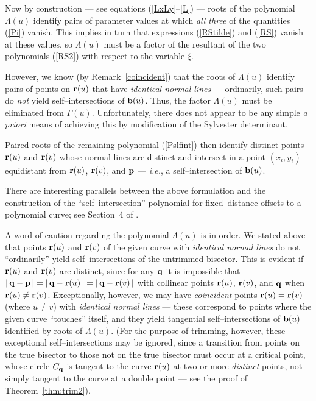 Now by construction --- see equations (\ref{LxLy}--\ref{L}) --- roots
of the polynomial $\Lambda(u)$ identify pairs of parameter values at
which {\it all three\/} of the quantities (\ref{Pi}) vanish. This
implies in turn that expressions (\ref{RStilde}) and (\ref{RS}) vanish
at these values, so $\Lambda(u)$ must be a factor of the resultant
of the two polynomials (\ref{RS2}) with respect to the variable $\xi$.

However, we know (by Remark~\ref{coincident}) that the roots of
$\Lambda(u)$ identify pairs of points on ${\bf r}(u)$ that have {\it
identical normal lines\/} --- ordinarily, such pairs do {\it not\/}
yield self--intersections of ${\bf b}(u)$. Thus, the factor $\Lambda(u)$
must be eliminated from $\Gamma(u)$. Unfortunately, there does not appear
to be any simple {\it a priori\/} means of achieving this by modification
of the Sylvester determinant.

Paired roots of the remaining polynomial (\ref{Pslfint}) then identify
distinct points ${\bf r}(u)$ and ${\bf r}(v)$ whose normal lines are
distinct and intersect in a point $(x_i,y_i)$ equidistant from ${\bf r}
(u)$, ${\bf r}(v)$, and ${\bf p}$ --- {\it i.e.}, a self--intersection
of ${\bf b}(u)$. \QED

There are interesting parallels between the above formulation and the
construction of the ``self--intersection'' polynomial for fixed--distance
offsets to a polynomial curve; see Section~4 of \cite{farouki90b}.

\begin{rmk}
{\rm
A word of caution regarding the polynomial $\Lambda(u)$ is in order.
We stated above that points ${\bf r}(u)$ and ${\bf r}(v)$ of the
given curve with {\it identical normal lines\/} do not ``ordinarily''
yield self--intersections of the untrimmed bisector. This is evident
if ${\bf r}(u)$ and ${\bf r}(v)$ are distinct, since for any ${\bf q}$
it is impossible that $|\,{\bf q}-{\bf p}\,|=|\,{\bf q}-{\bf r}(u)\,|=
|\,{\bf q}-{\bf r}(v)\,|$ with collinear points ${\bf r}(u)$, ${\bf r}
(v)$, and ${\bf q}$ when ${\bf r}(u)\not={\bf r}(v)$. Exceptionally,
however, we may have {\it coincident\/} points ${\bf r}(u)={\bf r}
(v)$ (where $u\not=v$) with {\it identical normal lines\/} --- these
correspond to points where the given curve ``touches'' itself, and
they yield tangential self--intersections of ${\bf b}(u)$ identified
by roots of $\Lambda(u)$. (For the purpose of trimming, however, these
exceptional self--intersections may be ignored, since a transition
from points on the true bisector to those not on the true bisector
must occur at a critical point, whose circle $C_{\bf q}$ is tangent
to the curve ${\bf r}(u)$ at two or more {\it distinct\/} points,
not simply tangent to the curve at a double point --- see the proof
of Theorem~\ref{thm:trim2}).
}
\end{rmk}

